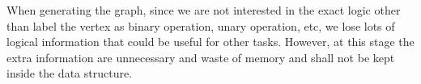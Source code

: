 \documentclass{article}
\begin{document}
When generating the graph, since we are not interested in the exact logic other than label
the vertex as binary operation, unary operation, etc, we lose lots of logical information
that could be useful for other tasks. However, at this stage the extra information are
unnecessary and waste of memory and shall not be kept inside the data structure.
\end{document}
